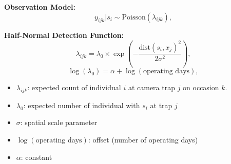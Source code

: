 \documentclass{article}
\begin{document}
\maketitle

\indent\indent\textbf{Observation Model:}
\[
y_{ijk} | s_i \sim \text{Poisson}(\lambda_{ijk}),
\]

\indent\indent\textbf{Half-Normal Detection Function:}
\begin{equation}
\lambda_{ijk} = \lambda_0 \times \exp\left(-\frac{\text{dist}(s_{i}, x_{j})^2}{2\sigma^2}\right),
\end{equation}
\begin{equation}
\log(\lambda_0) = \alpha + \log(\text{operating days}),
\end{equation}

\begin{itemize}
  \item $\lambda_{ijk}$: expected count of individual $i$ at camera trap $j$ on occasion $k$.
  \item $\lambda_0$: expected number of individual with $s_{i}$ at trap $j$
  \item $\sigma$: spatial scale parameter
  \item $\log(\text{operating days})$: offset (number of operating days)
  \item $\alpha$: constant
\end{itemize}
\end{document}
